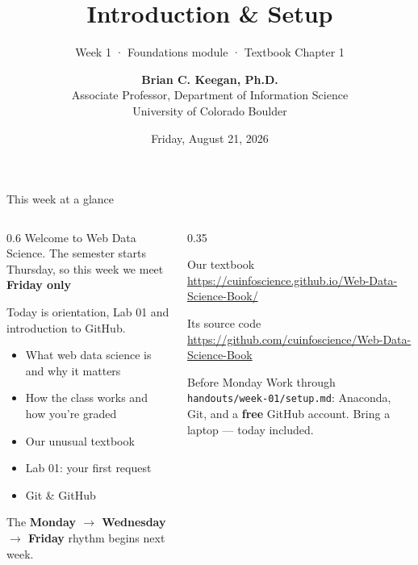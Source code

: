 \documentclass[9pt,aspectratio=169]{beamer}
\title[Week 1 · Introduction]{{\Huge Introduction \& Setup}}
\subtitle{Week 1 · Foundations module · Textbook Chapter 1}
\author[Keegan]{\textbf{Brian C. Keegan, Ph.D.} \\ Associate Professor, Department of Information Science \\ University of Colorado Boulder}
\date{Friday, August 21, 2026}
\begin{document}
\maketitle

\begin{frame}{This week at a glance}
    \begin{columns}[T]
        \begin{column}{0.6\textwidth}
            Welcome to Web Data Science. The semester starts Thursday, so this week we meet \textbf{Friday only}

            \bigskip
            Today is orientation, Lab 01 and introduction to GitHub.

            \bigskip

            \begin{itemize}\small
                \item What web data science is and why it matters
                \item How the class works and how you're graded
                \item Our unusual textbook
                \item Lab 01: your first request
                \item Git \& GitHub
            \end{itemize}

            \bigskip

            The \textbf{Monday $\rightarrow$ Wednesday $\rightarrow$ Friday} rhythm begins next week.
        \end{column}
        \begin{column}{0.35\textwidth}
            \begin{block}{Our textbook}
                \footnotesize \url{https://cuinfoscience.github.io/Web-Data-Science-Book/}
            \end{block}
            \begin{block}{Its source code}
                \footnotesize \url{https://github.com/cuinfoscience/Web-Data-Science-Book}
            \end{block}
            \begin{alertblock}{Before Monday}
                \footnotesize Work through \texttt{handouts/week-01/setup.md}: Anaconda, Git, and a \textbf{free} GitHub account. Bring a laptop --- today included.
            \end{alertblock}
        \end{column}
    \end{columns}
\end{frame}
\end{document}
